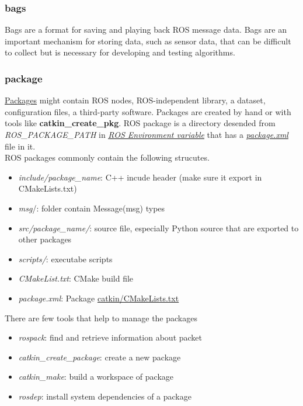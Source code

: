 \documentclass{report}
\begin{document}
\subsubsection{bags}
Bags are a format for saving and playing back ROS message data. Bags are an important mechanism for storing data, such as sensor data, that can be difficult to collect but is necessary for developing and testing algorithms.
\subsubsection{package}
\href{http://wiki.ros.org/Packages}{Packages} might contain ROS nodes, ROS-independent library, a dataset, configuration files, a third-party software. Packages are created by hand or with tools like \textbf{catkin\_create\_pkg}. ROS package is a directory desended from \textit{ROS\_PACKAGE\_PATH} in \textit{\href{http://wiki.ros.org/ROS/EnvironmentVariables}{\underline{ROS Environment variable}}} that has a \href{http://wiki.ros.org/Manifest}{\textit{package.xml}} file in it.\\
ROS packages commonly contain the following strucutes.
\begin{itemize} 
    \item \textit{include/package\_name}: C++ incude header (make sure it export in CMakeLists.txt) 
    \item \textit{msg}/: folder contain Message(msg) types
    \item \textit{src/package\_name/}: source file, especially Python source that are exported to other packages
    
    \item \emph{scripts/}: executabe scripts
    \item \emph{CMakeList.txt}: CMake build file
    \item \emph{package.xml}: Package
    \underline{\href{http://wiki.ros.org/catkin/CMakeLists.txt}{catkin/CMakeLists.txt}}
\end{itemize}
There are few tools that help to manage the packages
\begin{itemize}
    \item \textit{rospack}: find and retrieve information about packet
    \item \textit{catkin\_create\_package}: create a new package
    \item \textit{catkin\_make}: build a workspace of package
    \item \textit{rosdep}: install system dependencies of a package
\end{itemize}
\end{document}
